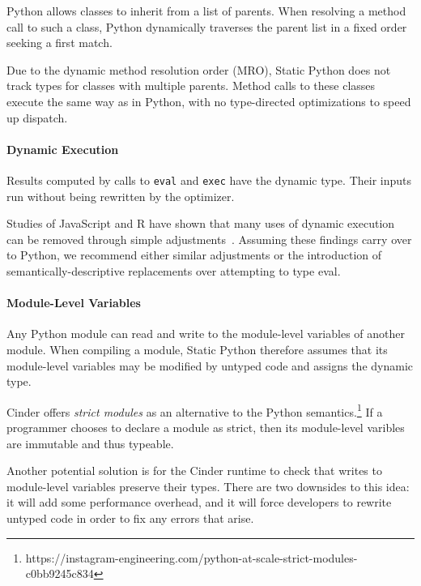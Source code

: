 \documentclass[english,cleveref,submission]{programming}
\newcommand{\SP}{Static Python}
\newcommand{\code}[1]{\texttt{#1}}
\begin{document}

Python allows classes to inherit from a list of parents.
When resolving a method call to such a class, Python
dynamically traverses the parent list in a fixed order
seeking a first match.

Due to the dynamic method resolution order (MRO),
\SP{} does not track types for classes with multiple parents.
Method calls to these classes execute the same way as
in Python, with no type-directed optimizations to speed up dispatch.


\paragraph{Dynamic Execution}
Results computed by calls to \code{eval} and \code{exec}
have the dynamic type.
Their inputs run without being rewritten
by the optimizer.

Studies of JavaScript and R have shown that many uses of dynamic execution
can be removed through simple adjustments~\cite{rhbv-ecoop-2011,gdkkv-oopsla-2021,mrmv-esop-2012}.
Assuming these findings carry over to Python, we recommend either similar
adjustments or the introduction of semantically-descriptive replacements
over attempting to type eval.


\paragraph{Module-Level Variables}

Any Python module can read and write to the module-level variables of another module.
When compiling a module, \SP{} therefore assumes that its module-level variables
may be modified by untyped code and assigns the dynamic type.

Cinder offers \emph{strict modules} as an alternative to the Python
semantics.\footnote{https://instagram-engineering.com/python-at-scale-strict-modules-c0bb9245c834}
If a programmer chooses to declare a module as strict, then its module-level varibles
are immutable and thus typeable.

Another potential solution is for the Cinder runtime to check that writes to module-level variables
preserve their types.
There are two downsides to this idea:
it will add some performance overhead,
and it will force developers to rewrite untyped code in order to fix any errors that arise.
\end{document}
